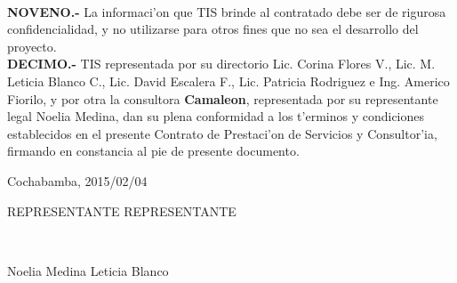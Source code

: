 \documentclass{article}
\newcommand{\fecha}[0]{2015/02/04}
\newcommand{\empresa}[0]{\textbf{Camaleon}}
\newcommand{\representante}[0]{Noelia Medina}
\begin{document}
\\
{\bf{NOVENO.-}}  La informaci'on que TIS brinde al contratado debe ser de rigurosa confidencialidad, y no utilizarse para otros fines que no sea el desarrollo del proyecto.
\\
{\bf{DECIMO.-}} TIS representada por su directorio Lic. Corina Flores V., Lic. M. Leticia Blanco C., Lic. David Escalera F., Lic. Patricia Rodriguez e Ing. Americo Fiorilo, y por otra la consultora \empresa,  representada por su representante legal \representante, dan su plena conformidad a los t'erminos y condiciones establecidos en el presente Contrato de Prestaci'on de Servicios y Consultor'ia, firmando en constancia al pie de presente documento.
\\
\begin{center}{Cochabamba, \fecha}\end{center}
\vspace{20mm}


\begin{center}
REPRESENTANTE   \hspace*{20mm} REPRESENTANTE
\end{center}
  \\
\begin{center}
Noelia Medina  \hspace*{20mm}  Leticia Blanco 
\end{center}
 \\
\end{document}

